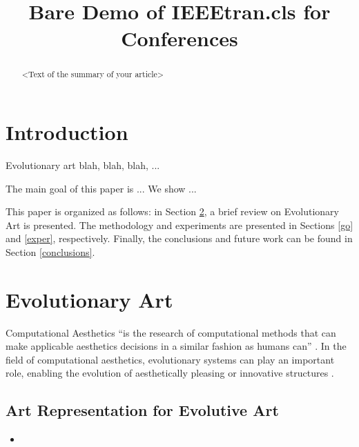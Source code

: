 \documentclass[conference]{IEEEtran}
\begin{document}
\title{Bare Demo of IEEEtran.cls for Conferences}
\author{
\and
{}
\and
{}
}

\maketitle

\begin{abstract}
<Text of the summary of your article>
\end{abstract}

\section{Introduction}\label{intro}
Evolutionary art blah, blah, blah, ...

The main goal of this paper is ... We show ...

This paper is organized as follows: in Section \ref{evo_art}, a brief review on Evolutionary Art is presented. The methodology and experiments are presented in Sections \ref{go} and \ref{exper}, respectively. Finally, the conclusions and future work can be found in Section \ref{conclusions}.

\section{Evolutionary Art}\label{evo_art}

Computational Aesthetics ``is the research of computational methods that can make applicable aesthetics decisions in a similar fashion as humans can'' \cite{COMPAESTH05:13-18:2005}. In the field of computational aesthetics, evolutionary systems can play an important role, enabling the evolution of aesthetically pleasing or innovative structures \cite{dipaola2009incorporating}.

\subsection{Art Representation for Evolutive Art} \label{evo_art:repr}
\begin{itemize}
	\item 
\end{itemize}
\end{document}
